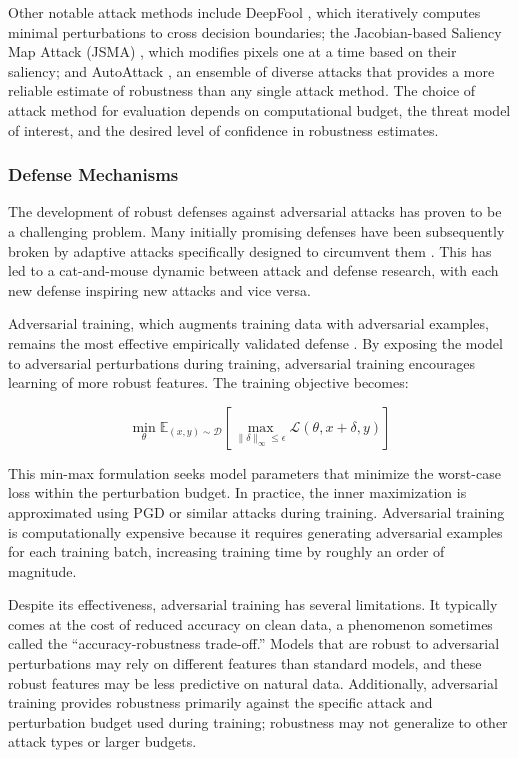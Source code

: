 \documentclass[12pt,a4paper]{article}
\begin{document}
Other notable attack methods include DeepFool \cite{moosavi2016}, which iteratively computes minimal perturbations to cross decision boundaries; the Jacobian-based Saliency Map Attack (JSMA) \cite{papernot2016}, which modifies pixels one at a time based on their saliency; and AutoAttack \cite{croce2020}, an ensemble of diverse attacks that provides a more reliable estimate of robustness than any single attack method. The choice of attack method for evaluation depends on computational budget, the threat model of interest, and the desired level of confidence in robustness estimates.

\subsubsection{Defense Mechanisms}

The development of robust defenses against adversarial attacks has proven to be a challenging problem. Many initially promising defenses have been subsequently broken by adaptive attacks specifically designed to circumvent them \cite{athalye2018}. This has led to a cat-and-mouse dynamic between attack and defense research, with each new defense inspiring new attacks and vice versa.

Adversarial training, which augments training data with adversarial examples, remains the most effective empirically validated defense \cite{madry2018}. By exposing the model to adversarial perturbations during training, adversarial training encourages learning of more robust features. The training objective becomes:

\begin{equation}
    \min_\theta \mathbb{E}_{(x,y) \sim \mathcal{D}} \left[ \max_{\|\delta\|_\infty \leq \epsilon} \mathcal{L}(\theta, x + \delta, y) \right]
\end{equation}

This min-max formulation seeks model parameters that minimize the worst-case loss within the perturbation budget. In practice, the inner maximization is approximated using PGD or similar attacks during training. Adversarial training is computationally expensive because it requires generating adversarial examples for each training batch, increasing training time by roughly an order of magnitude.

Despite its effectiveness, adversarial training has several limitations. It typically comes at the cost of reduced accuracy on clean data, a phenomenon sometimes called the ``accuracy-robustness trade-off.'' Models that are robust to adversarial perturbations may rely on different features than standard models, and these robust features may be less predictive on natural data. Additionally, adversarial training provides robustness primarily against the specific attack and perturbation budget used during training; robustness may not generalize to other attack types or larger budgets.
\end{document}
